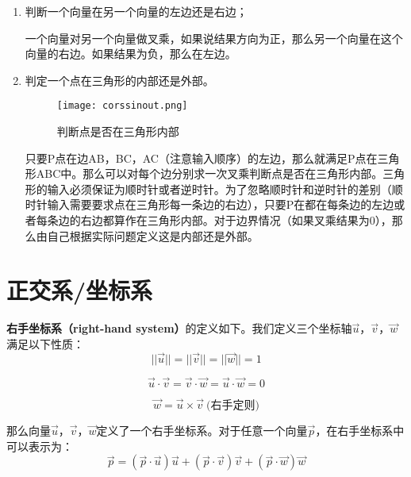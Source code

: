 \documentclass[openany]{progbookcn}
\begin{document}
\begin{enumerate}[1)]
	\item 判断一个向量在另一个向量的左边还是右边；
	
	一个向量对另一个向量做叉乘，如果说结果方向为正，那么另一个向量在这个向量的右边。如果结果为负，那么在左边。
	
	\item 判定一个点在三角形的内部还是外部。
	\begin{figure}[H]
		\centering
		\texttt{[image: corssinout.png]}
		\caption{判断点是否在三角形内部}
		\label{fig:corssio}
	\end{figure}

	只要P点在边AB，BC，AC（注意输入顺序）的左边，那么就满足P点在三角形ABC中。那么可以对每个边分别求一次叉乘判断点是否在三角形内部。三角形的输入必须保证为顺时针或者逆时针。为了忽略顺时针和逆时针的差别（顺时针输入需要要求点在三角形每一条边的右边），只要P在都在每条边的左边或者每条边的右边都算作在三角形内部。对于边界情况（如果叉乘结果为0），那么由自己根据实际问题定义这是内部还是外部。
	
\end{enumerate}

\section{正交系/坐标系}

\textbf{右手坐标系（right-hand system）}的定义如下。我们定义三个坐标轴$\overrightarrow{u}$，$\overrightarrow{v}$，$\overrightarrow{w}$满足以下性质：
\begin{equation}
	||\overrightarrow{u}||=||\overrightarrow{v}||=||\overrightarrow{w}||=1
\end{equation}

\begin{equation}
	\overrightarrow{u}\cdot\overrightarrow{v}=\overrightarrow{v}\cdot\overrightarrow{w}=\overrightarrow{u}\cdot\overrightarrow{w}=0
\end{equation}

\begin{equation}
	\overrightarrow{w}=\overrightarrow{u}\times\overrightarrow{v}\ \text{(右手定则)}
\end{equation}

那么向量$\overrightarrow{u}$，$\overrightarrow{v}$，$\overrightarrow{w}$定义了一个右手坐标系。对于任意一个向量$\overrightarrow{p}$，在右手坐标系中可以表示为：
\begin{equation}
	\overrightarrow{p}=(\overrightarrow{p}\cdot \overrightarrow{u})\overrightarrow{u}+(\overrightarrow{p}\cdot \overrightarrow{v})\overrightarrow{v}+(\overrightarrow{p}\cdot \overrightarrow{w})\overrightarrow{w}
\end{equation}
\end{document}
